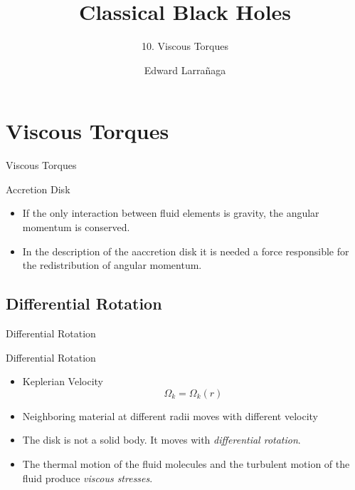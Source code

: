 \documentclass{beamer}
\title{Classical Black Holes} %
\subtitle{10. Viscous Torques  } %
\author{Edward Larra\~{n}aga}
\begin{document}
\frame{\maketitle}


\section{Viscous Torques}
\begin{frame}
\Huge
Viscous Torques
\end{frame}

\begin{frame}{Accretion Disk}
	\begin{itemize}
	\item If the only interaction between fluid elements is gravity, the angular momentum is conserved.
	\pause
	\item In the description of the aaccretion disk it is needed a force responsible for the redistribution of angular momentum.
	\end{itemize}
\end{frame}

\subsection{Differential Rotation}
\begin{frame}
\Huge
Differential Rotation
\end{frame}

\begin{frame}{Differential Rotation}
	\begin{itemize}
	\item Keplerian Velocity
	\[ \Omega_k = \Omega_k (r)\]
	\pause
	\item Neighboring material at different radii moves with different velocity
	\pause
	\item The disk is not a solid body. It moves with \textit{differential rotation}.
	\pause
	\item The thermal motion of the fluid molecules and the turbulent motion of the fluid produce \textit{viscous stresses}.
	\end{itemize}
\end{frame}
\end{document}

